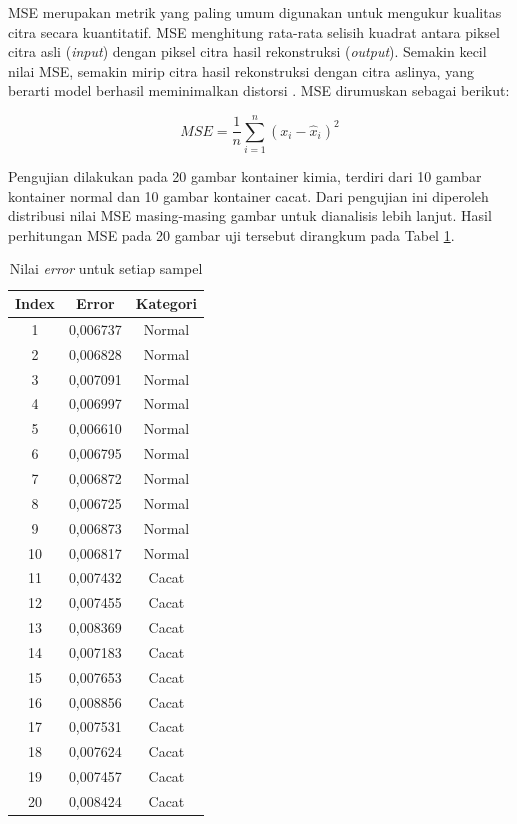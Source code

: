 MSE merupakan metrik yang paling umum digunakan untuk mengukur
kualitas citra secara kuantitatif. MSE menghitung rata-rata selisih
kuadrat antara piksel citra asli (\textit{input}) dengan piksel citra hasil
rekonstruksi (\textit{output}). Semakin kecil nilai MSE, semakin mirip citra
hasil rekonstruksi dengan citra aslinya, yang berarti model berhasil
meminimalkan distorsi \citep{27}. MSE dirumuskan sebagai berikut:

\begin{equation}
  MSE = \frac{1}{n} \sum_{i=1}^{n} (x_i - \hat{x}_i)^2
\end{equation}

Pengujian dilakukan pada 20 gambar kontainer kimia, terdiri dari 10
gambar kontainer normal dan 10 gambar kontainer cacat. Dari pengujian
ini diperoleh distribusi nilai MSE masing-masing gambar untuk
dianalisis lebih lanjut. Hasil perhitungan MSE pada 20 gambar uji
tersebut dirangkum pada Tabel \ref{tab:error-samples}.

\begin{table}[H]
  \centering
  \caption{Nilai \textit{error} untuk setiap sampel}
  \label{tab:error-samples}
  \begin{tabular}{ccc}
    \toprule
    \textbf{Index} & \textbf{Error} & \textbf{Kategori} \\
    \midrule
    1  & 0,006737 & Normal \\
    2  & 0,006828 & Normal \\
    3  & 0,007091 & Normal \\
    4  & 0,006997 & Normal \\
    5  & 0,006610 & Normal \\
    6  & 0,006795 & Normal \\
    7  & 0,006872 & Normal \\
    8  & 0,006725 & Normal \\
    9  & 0,006873 & Normal \\
    10 & 0,006817 & Normal \\
    11 & 0,007432 & Cacat \\
    12 & 0,007455 & Cacat \\
    13 & 0,008369 & Cacat \\
    14 & 0,007183 & Cacat \\
    15 & 0,007653 & Cacat \\
    16 & 0,008856 & Cacat \\
    17 & 0,007531 & Cacat \\
    18 & 0,007624 & Cacat \\
    19 & 0,007457 & Cacat \\
    20 & 0,008424 & Cacat \\
    \bottomrule
  \end{tabular}
\end{table}

